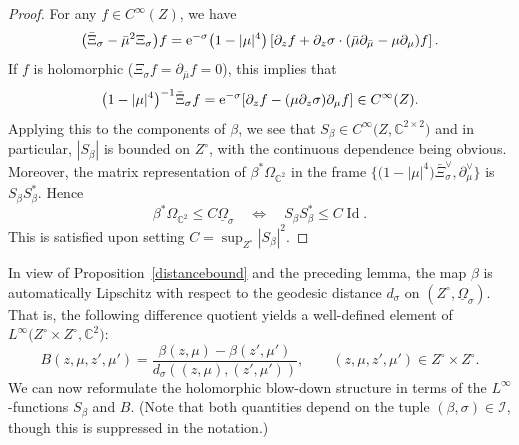 \documentclass[10pt,a4paper]{amsart}
\numberwithin{equation}{section}
\theoremstyle{definition}
\newcommand{\C}{\mathbb{C}} %
\newcommand{\1}{{\bf 1}}
\newcommand{\Om}{{\underline{\Omega}}}
\begin{document}
\begin{proof} For any $f\in C^\infty(Z)$, we have
\begin{equation*}
\bigl(\bar \Xi_\sigma - \bar \mu^2 \Xi_\sigma\bigr)f = {\rm e}^{-\sigma} \bigl(1-|\mu|^4\bigr) \left[ \partial_z f + \partial_z \sigma\cdot (\bar \mu \partial_{\bar \mu} - \mu \partial_\mu)f\right].
\end{equation*}
If $f$ is holomorphic ($\Xi_\sigma f = \partial_{\bar \mu} f =0$), this implies that
\begin{equation*}%
\bigl(1-|\mu|^4\bigr)^{-1} \bar \Xi_\sigma f = {\rm e}^{-\sigma} [ \partial_z f - (\mu \partial_z \sigma) \partial_\mu f ] \in C^\infty(Z).
\end{equation*}
Applying this to the components of $\beta$, we see that $S_\beta \in C^\infty\bigl(Z,\C^{2\times 2}\bigr)$ and in particular, $|S_\beta|$ is bounded on $Z^\circ$, with the continuous dependence being obvious. Moreover, the matrix representation of $\beta^*\Omega_{\C^2}$ in the frame $\big\{\bigl(1-|\mu|^4\bigr)\bar \Xi_\sigma^\vee,\partial_\mu^\vee\big\}$ is $S_\beta S_\beta^*$. Hence
\begin{equation}\label{omegainequality1}
\beta^*\Omega_{\C^2} \le C \Om_\sigma\quad \Leftrightarrow \quad S_\beta S_\beta^* \le C \operatorname{Id}.
\end{equation}
This is satisfied upon setting $C=\sup_{Z^\circ}|S_\beta|^2$.
\end{proof}

In view of Proposition~\ref{distancebound} and the preceding lemma, the map $\beta$ is automatically Lipschitz with respect to the geodesic distance $d_\sigma$ on $(Z^\circ,\Om_\sigma)$. That is, the following difference quotient yields a well-defined element of $L^\infty\bigl(Z^\circ\times Z^\circ,\C^2\bigr)$:
\[
		B(z,\mu,z',\mu') = \frac{\beta(z,\mu)- \beta(z',\mu')}{d_\sigma((z,\mu),(z',\mu'))},\qquad (z,\mu,z',\mu')\in Z^\circ \times Z^\circ.
\]
We can now reformulate the holomorphic blow-down structure in terms of the $L^\infty$-functions $S_\beta$ and $B$. (Note that both quantities depend on the tuple $(\beta,\sigma)\in \mathcal I$, though this is suppressed in the notation.)
\end{document}
